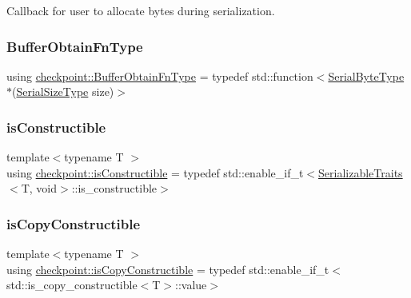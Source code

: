 Callback for user to allocate bytes during serialization. 

\mbox{\label{namespacecheckpoint_a8a2558a1dd0db386339dd81c193b7f10}} 
\subsubsection{\texorpdfstring{Buffer\+Obtain\+Fn\+Type}{BufferObtainFnType}}
{\footnotesize\ttfamily using \hyperlink{namespacecheckpoint_a8a2558a1dd0db386339dd81c193b7f10}{checkpoint\+::\+Buffer\+Obtain\+Fn\+Type} = typedef std\+::function$<$\hyperlink{namespacecheckpoint_ae57f01cdc0b81776c23b6c7c934c58f5}{Serial\+Byte\+Type}$\ast$(\hyperlink{namespacecheckpoint_a083f6674da3f94c2901b18c6d238217c}{Serial\+Size\+Type} size)$>$}

\mbox{\label{namespacecheckpoint_a48ec2649d5cbd890f67ea1193cc0d51a}} 
\subsubsection{\texorpdfstring{is\+Constructible}{isConstructible}}
{\footnotesize\ttfamily template$<$typename T $>$ \\
using \hyperlink{namespacecheckpoint_a48ec2649d5cbd890f67ea1193cc0d51a}{checkpoint\+::is\+Constructible} = typedef std\+::enable\+\_\+if\+\_\+t$<$\hyperlink{structcheckpoint_1_1_serializable_traits}{Serializable\+Traits}$<$T, void$>$\+::is\+\_\+constructible$>$}

\mbox{\label{namespacecheckpoint_a60a9850fa59d4b236b2f888baf135a95}} 
\subsubsection{\texorpdfstring{is\+Copy\+Constructible}{isCopyConstructible}}
{\footnotesize\ttfamily template$<$typename T $>$ \\
using \hyperlink{namespacecheckpoint_a60a9850fa59d4b236b2f888baf135a95}{checkpoint\+::is\+Copy\+Constructible} = typedef std\+::enable\+\_\+if\+\_\+t$<$std\+::is\+\_\+copy\+\_\+constructible$<$T$>$\+::value$>$}

